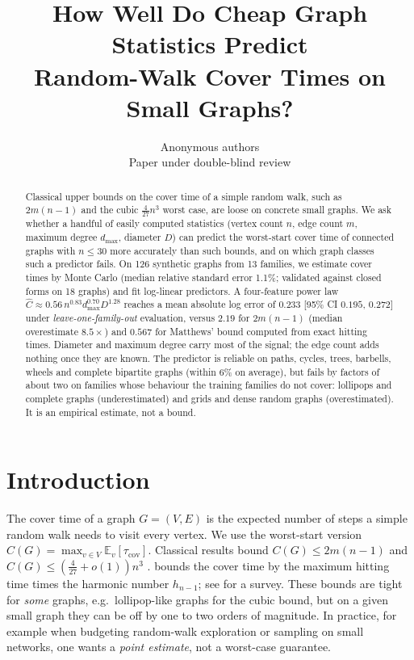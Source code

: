 \documentclass{article} %
\title{How Well Do Cheap Graph Statistics Predict\\ Random-Walk Cover Times on Small Graphs?}
\author{Anonymous authors\\Paper under double-blind review}
\renewcommand{\Cov}{C}
\begin{document}
\maketitle

\begin{abstract}
Classical upper bounds on the cover time of a simple random walk, such as $2m(n-1)$ and the cubic $\frac{4}{27}n^3$ worst case, are loose on concrete small graphs.
We ask whether a handful of easily computed statistics (vertex count $n$, edge count $m$, maximum degree $d_{\max}$, diameter $D$) can predict the worst-start cover time of connected graphs with $n\le 30$ more accurately than such bounds, and on which graph classes such a predictor fails.
On 126 synthetic graphs from 13 families, we estimate cover times by Monte Carlo (median relative standard error 1.1\%; validated against closed forms on 18 graphs) and fit log-linear predictors.
A four-feature power law $\hat C \approx 0.56\, n^{0.83} d_{\max}^{0.70} D^{1.28}$ reaches a mean absolute log error of $0.233$ [95\% CI $0.195$, $0.272$] under \emph{leave-one-family-out} evaluation, versus $2.19$ for $2m(n-1)$ (median overestimate $8.5\times$) and $0.567$ for Matthews' bound computed from exact hitting times.
Diameter and maximum degree carry most of the signal; the edge count adds nothing once they are known.
The predictor is reliable on paths, cycles, trees, barbells, wheels and complete bipartite graphs (within 6\% on average), but fails by factors of about two on families whose behaviour the training families do not cover: lollipops and complete graphs (underestimated) and grids and dense random graphs (overestimated).
It is an empirical estimate, not a bound.
\end{abstract}

\section{Introduction}
The cover time of a graph $G=(V,E)$ is the expected number of steps a simple random walk needs to visit every vertex. We use the worst-start version $\Cov(G)=\max_{v\in V}\mathbb{E}_v[\tau_{\mathrm{cov}}]$.
Classical results bound $\Cov(G)\le 2m(n-1)$ \citep{aleliunas1979} and $\Cov(G)\le(\frac{4}{27}+o(1))n^3$ \citep{feige1995}. \citet{matthews1988} bounds the cover time by the maximum hitting time times the harmonic number $h_{n-1}$; see \citet{lovasz1993} for a survey.
These bounds are tight for \emph{some} graphs, e.g.\ lollipop-like graphs for the cubic bound, but on a given small graph they can be off by one to two orders of magnitude.
In practice, for example when budgeting random-walk exploration or sampling on small networks, one wants a \emph{point estimate}, not a worst-case guarantee.
\end{document}

